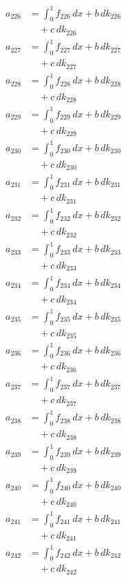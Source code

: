 \documentclass{article}
\begin{document}
\begin{align}
a_{226} &= \int_0^1 f_{226}\,dx + b\,dk_{226} \\
&\quad + c\,dk_{226} \\
a_{227} &= \int_0^1 f_{227}\,dx + b\,dk_{227} \\
&\quad + c\,dk_{227} \\
a_{228} &= \int_0^1 f_{228}\,dx + b\,dk_{228} \\
&\quad + c\,dk_{228} \\
a_{229} &= \int_0^1 f_{229}\,dx + b\,dk_{229} \\
&\quad + c\,dk_{229} \\
a_{230} &= \int_0^1 f_{230}\,dx + b\,dk_{230} \\
&\quad + c\,dk_{230} \\
a_{231} &= \int_0^1 f_{231}\,dx + b\,dk_{231} \\
&\quad + c\,dk_{231} \\
a_{232} &= \int_0^1 f_{232}\,dx + b\,dk_{232} \\
&\quad + c\,dk_{232} \\
a_{233} &= \int_0^1 f_{233}\,dx + b\,dk_{233} \\
&\quad + c\,dk_{233} \\
a_{234} &= \int_0^1 f_{234}\,dx + b\,dk_{234} \\
&\quad + c\,dk_{234} \\
a_{235} &= \int_0^1 f_{235}\,dx + b\,dk_{235} \\
&\quad + c\,dk_{235} \\
a_{236} &= \int_0^1 f_{236}\,dx + b\,dk_{236} \\
&\quad + c\,dk_{236} \\
a_{237} &= \int_0^1 f_{237}\,dx + b\,dk_{237} \\
&\quad + c\,dk_{237} \\
a_{238} &= \int_0^1 f_{238}\,dx + b\,dk_{238} \\
&\quad + c\,dk_{238} \\
a_{239} &= \int_0^1 f_{239}\,dx + b\,dk_{239} \\
&\quad + c\,dk_{239} \\
a_{240} &= \int_0^1 f_{240}\,dx + b\,dk_{240} \\
&\quad + c\,dk_{240} \\
a_{241} &= \int_0^1 f_{241}\,dx + b\,dk_{241} \\
&\quad + c\,dk_{241} \\
a_{242} &= \int_0^1 f_{242}\,dx + b\,dk_{242} \\
&\quad + c\,dk_{242} \\

\end{align}
\end{document}
